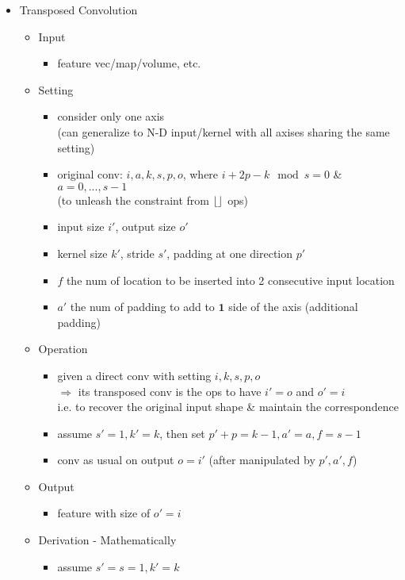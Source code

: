 \begin{itemize}
\item Transposed Convolution
	\begin{itemize}
	\item Input
		\begin{itemize}
		\item feature vec/map/volume, etc.
		\end{itemize}
	\item Setting
		\begin{itemize}
		\item consider only one axis \\
		(can generalize to N-D input/kernel with all axises sharing the same setting)
		\item original conv: $i, a, k, s, p, o$, where $i +2p - k \mod s = 0$ \& $a={0,...,s-1}$ \\
		(to unleash the constraint from $\lfloor\rfloor$ ops)
		\item input size $i'$, output size $o'$
		\item kernel size $k'$, stride $s'$, padding at one direction $p'$
		\item $f$ the num of location to be inserted into 2 consecutive input location
		\item $a'$ the num of padding to add to $\mathbf 1$ side of the axis (additional padding)
		\end{itemize}
	\item Operation
		\begin{itemize}
		\item given a direct conv with setting $i, k, s, p, o$ \\
		$\Rightarrow$ its transposed conv is the ops to have $i'=o$ and $o'=i$ \\
		i.e. to recover the original input shape \& maintain the correspondence
		\item assume $s'=1, k'=k$, then set $p'+p=k-1, a'=a, f=s-1$
		\item conv as usual on output $o=i'$ (after manipulated by $p', a', f$)
		\end{itemize}
	\item Output
		\begin{itemize}
		\item feature with size of $o'=i$
		\end{itemize}
	\item Derivation - Mathematically
		\begin{itemize}
		\item assume $s'=s=1, k'=k$ \\

\end{itemize}
\end{itemize}
\end{itemize}
